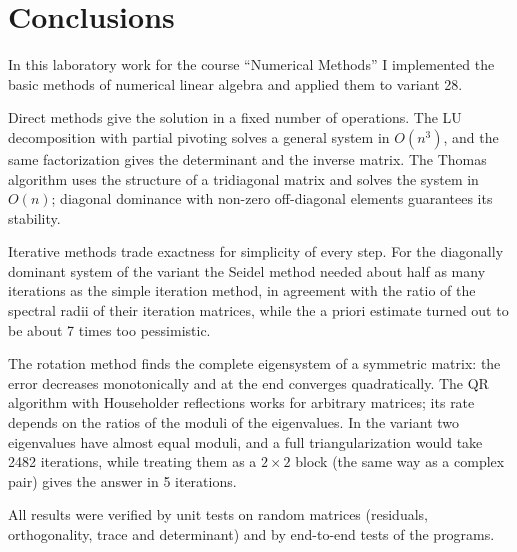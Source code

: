 \section{Conclusions}

In this laboratory work for the course \enquote{Numerical Methods} I implemented the basic
methods of numerical linear algebra and applied them to variant 28.

Direct methods give the solution in a fixed number of operations. The LU decomposition with
partial pivoting solves a general system in $O(n^3)$, and the same factorization gives the
determinant and the inverse matrix. The Thomas algorithm uses the structure of a tridiagonal
matrix and solves the system in $O(n)$; diagonal dominance with non-zero off-diagonal elements
guarantees its stability.

Iterative methods trade exactness for simplicity of every step. For the diagonally dominant
system of the variant the Seidel method needed about half as many iterations as the simple
iteration method, in agreement with the ratio of the spectral radii of their iteration matrices,
while the a priori estimate turned out to be about 7 times too pessimistic.

The rotation method finds the complete eigensystem of a symmetric matrix: the error decreases
monotonically and at the end converges quadratically. The QR algorithm with Householder
reflections works for arbitrary matrices; its rate depends on the ratios of the moduli of the
eigenvalues. In the variant two eigenvalues have almost equal moduli, and a full
triangularization would take 2482 iterations, while treating them as a $2 \times 2$ block (the
same way as a complex pair) gives the answer in 5 iterations.

All results were verified by unit tests on random matrices (residuals, orthogonality, trace and
determinant) and by end-to-end tests of the programs.

\pagebreak
